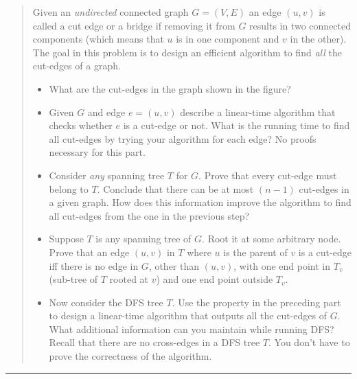 \documentclass[11pt]{article}
\begin{document}

\begin{quote}
 Given an \emph{undirected} connected graph $G=(V,E)$ an edge $(u,v)$ is
  called a cut edge or a bridge if removing it from $G$ results in
  two connected components (which means that $u$ is in one component
  and $v$ in the other). The goal in this problem is to design an efficient
  algorithm to find {\em all} the cut-edges of a graph.

  \begin{itemize}
  \item What are the cut-edges in the graph shown in the figure?

  \item Given $G$ and edge $e=(u,v)$ describe a linear-time algorithm
    that checks whether $e$ is a cut-edge or not. What is the running time
    to find all cut-edges by trying your algorithm for each edge? No proofs
    necessary for this part.
  \item Consider {\em any} spanning tree $T$ for $G$. Prove that every
    cut-edge must belong to $T$. Conclude that there can be at most $(n-1)$
    cut-edges in a given graph. How does this information improve the
    algorithm to find all cut-edges from the one in the previous step?
  \item Suppose $T$ is any spanning tree of $G$. Root it at some
    arbitrary node.  Prove that an edge $(u,v)$ in $T$ where $u$ is
    the parent of $v$ is a cut-edge iff there is no edge in $G$, other
    than $(u,v)$, with one end point in $T_v$ (sub-tree of $T$ rooted
    at $v$) and one end point outside $T_v$.
  \item Now consider the DFS tree $T$.  Use the property in the
    preceding part to design a linear-time algorithm that outputs all
    the cut-edges of $G$. What additional information can you maintain
    while running DFS? Recall that there are no cross-edges in a DFS
    tree $T$. You don't have to prove the correctness of
    the algorithm.
  \end{itemize}
\end{quote}
\hrule
\end{document}
